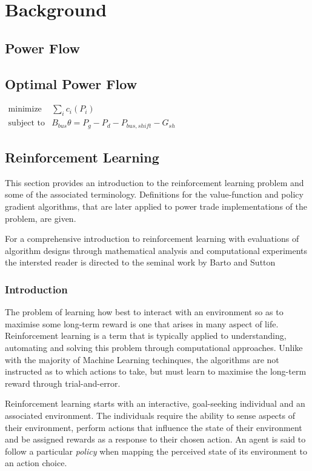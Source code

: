 \chapter{Background}

\section{Power Flow}

\section{Optimal Power Flow}

$
  \begin{array}{ll}
  \mbox{minimize}   & \sum_i c_i (P_i) \\
  \mbox{subject to} & B_{bus} \theta = P_g - P_d - P_{bus,shift} - G_{sh}
  \end{array}
$

\section{Reinforcement Learning}
This section provides an introduction to the reinforcement learning problem and
some of the associated terminology.  Definitions for the value-function and
policy gradient algorithms, that are later applied to power trade
implementations of the problem, are given.

For a comprehensive introduction to reinforcement learning with evaluations of
algorithm designs through mathematical analysis and computational experiments
the intersted reader is directed to the seminal work by Barto and Sutton

\subsection{Introduction}
The problem of learning how best to interact with an environment so as to
maximise some long-term reward is one that arises in many aspect of life.
Reinforcement learning is a term that is typically applied to
understanding, automating and solving this problem through computational
approaches. Unlike with the majority of Machine Learning techinques, the
algorithms are not instructed as to which actions to take, but must learn to
maximise the long-term reward through trial-and-error.

Reinforcement learning starts with an interactive, goal-seeking individual and
an associated environment.  The individuals require the ability to sense
aspects of their environment, perform actions that influence the state of their
environment and be assigned rewards as a response to their chosen action.  An
agent is said to follow a particular \textit{policy} when mapping the
perceived state of its environment to an action choice.

